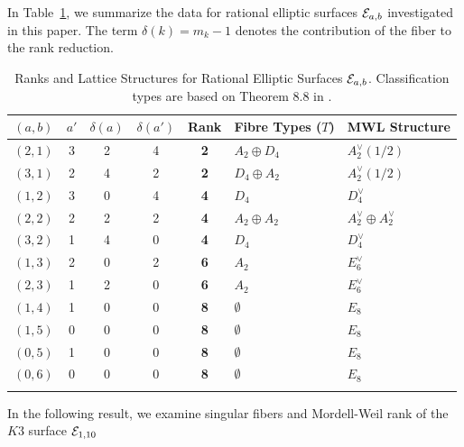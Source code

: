 \documentclass[11pt]{amsart}
\begin{document}
In  Table~\ref{Tab1}, we summarize the data for  rational elliptic surfaces ${\mathcal E}_{a,b}$ investigated in this paper. The term $\delta(k) = m_k - 1$ denotes the contribution of the fiber to the rank reduction.

\begin{table}[htbp]
	\centering
	\small
	\begin{tabular}{@{}cccccll@{}}
		\toprule
		$(a,b)$ & $a'$ & $\delta(a)$ & $\delta(a')$ & Rank & Fibre Types ($T$) & MWL Structure \\ \midrule
		$(2,1)$ & 3 & 2 & 4 & \textbf{2} & $A_2 \oplus D_4$ & $A_2^\vee(1/2)$ \\
		$(3,1)$ & 2 & 4 & 2 & \textbf{2} & $D_4 \oplus A_2$ & $A_2^\vee(1/2)$ \\
		$(1,2)$ & 3 & 0 & 4 & \textbf{4} & $D_4$ & $D_4^\vee$ \\
		$(2,2)$ & 2 & 2 & 2 & \textbf{4} & $A_2 \oplus A_2$ & $A_2^\vee \oplus A_2^\vee$ \\
		$(3,2)$ & 1 & 4 & 0 & \textbf{4} & $D_4$ & $D_4^\vee$ \\
		$(1,3)$ & 2 & 0 & 2 & \textbf{6} & $A_2$ & $E_6^\vee$ \\
		$(2,3)$ & 1 & 2 & 0 & \textbf{6} & $A_2$ & $E_6^\vee$ \\
		$(1,4)$ & 1 & 0 & 0 & \textbf{8} & $\emptyset$ & $E_8$ \\
		$(1,5)$ & 0 & 0 & 0 & \textbf{8} & $\emptyset$ & $E_8$ \\
		$(0,5)$ & 1 & 0 & 0 & \textbf{8} & $\emptyset$ & $E_8$ \\
		$(0,6)$ & 0 & 0 & 0 & \textbf{8} & $\emptyset$ & $E_8$ \\ \bottomrule
		\vspace{3pt}
	\end{tabular}
	\caption{Ranks and Lattice Structures for Rational Elliptic Surfaces ${\mathcal E}_{a,b}$. 
		Classification types are based on Theorem 8.8 in \cite{Schuett2019}.}
			\label{Tab1}
\end{table}

In the following result, we examine singular fibers and Mordell-Weil rank of the $K3$ surface ${\mathcal E}_{1,10}$
\end{document}
